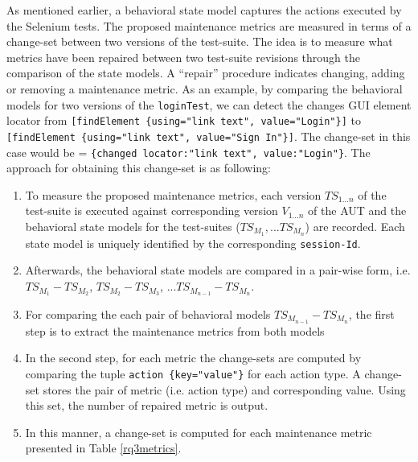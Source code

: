 As mentioned earlier, a behavioral state model captures the actions executed by the Selenium tests. The proposed maintenance metrics are measured in terms of a change-set between two versions of the test-suite. The idea is to measure what metrics have been repaired between two test-suite revisions through the comparison of the state models. A ``repair'' procedure indicates changing, adding or removing a maintenance metric. As an example, by comparing the behavioral models for two versions of the \texttt{loginTest}, we can detect the changes GUI element locator from \texttt{[findElement \{using="link text", value="Login"\}]} to \texttt{[findElement \{using="link text", value="Sign In"\}]}. The change-set in this case would be = \texttt{\{changed locator:"link text", value:"Login"\}}.
The approach for obtaining this change-set is as following:

\begin{enumerate}
\item To measure the proposed maintenance metrics, each version $TS_{1...n}$ of the test-suite is executed against corresponding version $V_{1...n}$ of the AUT and the behavioral state models for the test-suites (\textit{$TS_{M_1}, ...TS_{M_n}$}) are recorded. Each state model is uniquely identified by the corresponding \texttt{session-Id}. 

\item Afterwards, the behavioral state models are compared in a pair-wise form, i.e. \textit{$TS_{M_1} - TS_{M_2}$}, \textit{$TS_{M_2} - TS_{M_3}$}, ...\textit{$TS_{M_{n-1}} - TS_{M_n}$}.  

\item For comparing the each pair of behavioral models \textit{$TS_{M_{n-1}} - TS_{M_n}$}, the first step is to extract the maintenance metrics from both models 

\item In the second step, for each metric the change-sets are computed by comparing the tuple \texttt{action {\{key="value"}\}} for each action type. A change-set stores the pair of metric (i.e. action type) and corresponding value. Using this set, the number of repaired metric is output. 

\item In this manner, a change-set is computed for each maintenance metric presented in Table \ref{rq3metrics}.


\end{enumerate}

